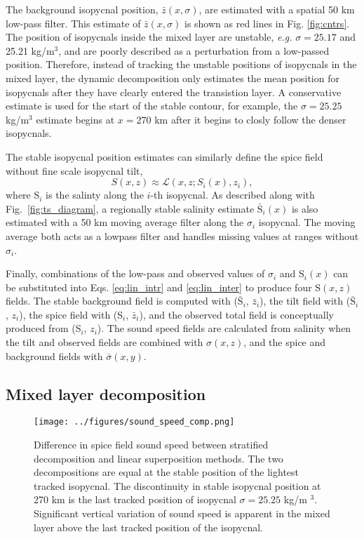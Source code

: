 \documentclass[preprint,NumberedRefs]{JASA}
\begin{document}
The background isopycnal position, $\bar{z}(x, \sigma)$, are estimated with a spatial 50 km low-pass filter. This estimate of $\bar{z}(x, \sigma)$ is shown as red lines in Fig. \ref{fig:cntrs}. The position of isopycnals inside the mixed layer are unstable, \emph{e.g.} $\sigma=25.17$ and 25.21 kg/m$^3$, and are poorly described as a perturbation from a low-passed position. Therefore, instead of tracking the unstable positions of isopycnals in the mixed layer, the dynamic decomposition only estimates the mean position for isopycnals after they have clearly entered the transistion layer. A conservative estimate is used for the start of the stable contour, for example, the $\sigma=25.25$ kg/m$^3$ estimate begins at $x=270$ km after it begins to closly follow the denser isopycnals.

The stable isopycnal position estimates can similarly define the spice field without fine scale isopycnal tilt,
\begin{equation}
    S(x, z)\approx\mathcal{L}(x, z; S_i(x), z_i),
    \label{eq:lin_inter}
\end{equation}
where S$_i$ is the salinty along the $i$-th isopycnal. As described along with Fig.~\ref{fig:ts_diagram}, a regionally stable salinity estimate $\bar{\textrm{S}}_i(x)$ is also estimated with a 50 km moving average filter along the $\sigma_i$ isopycnal. The moving average both acts as a lowpass filter and handles missing values at ranges without $\sigma_i$.

Finally, combinations of the low-pass and observed values of $\sigma_i$ and S$_i(x)$ can be substituted into Eqs. \eqref{eq:lin_intr} and \eqref{eq:lin_inter} to produce four S$(x,z)$ fields. The stable background field is computed with ($\bar{\textrm{S}}_i$, $\bar{z}_i$), the tilt field with ($\bar{\textrm{S}}_i$, $z_i$), the spice field with (S$_i$, $\bar{z}_i$), and the observed total field is conceptually produced from (S$_i$, $z_i$). The sound speed fields are calculated from salinity when the tilt and observed fields are combined with $\sigma(x,z)$, and the spice and background fields with $\bar{\sigma}(x,y)$\citep{TEOS10}.

\subsection{Mixed layer decomposition}\label{ssec:ml_decomp}
\begin{figure}
\texttt{[image: ../figures/sound\_speed\_comp.png]}
    \caption{\label{fig:c_diff}{Difference in spice field sound speed between stratified decomposition and linear superposition methods. The two decompositions are equal at the stable position of the lightest tracked isopycnal. The discontinuity in stable isopycnal position at 270 km is the last tracked position of isopycnal $\sigma=25.25$ kg/m $^3$. Significant vertical variation of sound speed is apparent in the mixed layer above the last tracked position of the isopycnal.}}
\end{figure}
\end{document}
